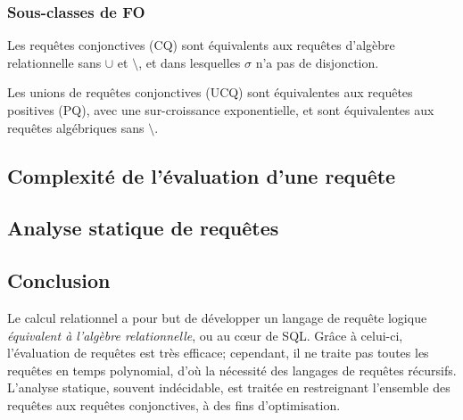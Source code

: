 \documentclass[french, toc]{../cs-classes/cs-classes}
\begin{document}
\subsubsection{Sous-classes de FO}
Les requêtes conjonctives (CQ) sont équivalents aux requêtes d'algèbre relationnelle sans $\cup$ et $\setminus$, et dans lesquelles $\sigma$ n'a pas de disjonction.

Les unions de requêtes conjonctives (UCQ) sont équivalentes aux requêtes positives (PQ), avec une sur-croissance exponentielle, et sont équivalentes aux requêtes algébriques sans $\setminus$.

\subsection{Complexité de l'évaluation d'une requête}

\subsection{Analyse statique de requêtes}

\subsection*{Conclusion}
Le calcul relationnel a pour but de développer un langage de requête logique \emph{équivalent à l'algèbre relationnelle}, ou au cœur de SQL.
Grâce à celui-ci, l'évaluation de requêtes est très efficace; cependant, il ne traite pas toutes les requêtes en temps polynomial, d'où la nécessité des langages de requêtes récursifs. L'analyse statique, souvent indécidable, est traitée en restreignant l'ensemble des requêtes aux requêtes conjonctives, à des fins d'optimisation.
\end{document}
